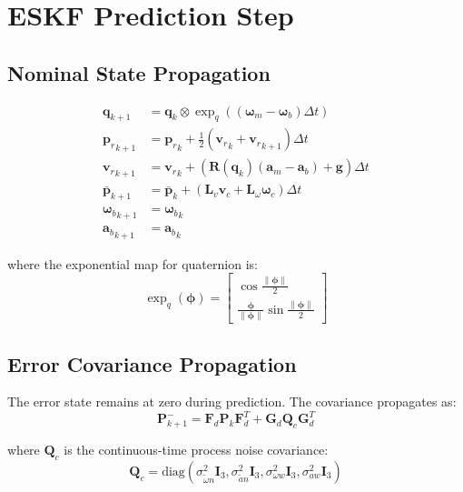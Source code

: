 \documentclass[11pt,a4paper]{article}
\newcommand{\quat}{\mathbf{q}}
\newcommand{\pr}{\mathbf{p}_r}
\newcommand{\vr}{\mathbf{v}_r}
\newcommand{\pbar}{\bar{\mathbf{p}}}
\newcommand{\bgyr}{\bm{\omega}_b}
\newcommand{\bacc}{\mathbf{a}_b}
\newcommand{\R}{\mathbf{R}}
\newcommand{\I}{\mathbf{I}}
\begin{document}
\section{ESKF Prediction Step}

\subsection{Nominal State Propagation}
\begin{align}
    \quat_{k+1} &= \quat_k \otimes \exp_q\left((\bm{\omega}_m - \bgyr) \Delta t\right) \\
    {\pr}_{k+1} &= {\pr}_k + \frac{1}{2}({\vr}_k + {\vr}_{k+1}) \Delta t \\
    {\vr}_{k+1} &= {\vr}_k + \left(\R(\quat_k)(\mathbf{a}_m - \bacc) + \mathbf{g}\right) \Delta t \\
    {\pbar}_{k+1} &= {\pbar}_k + \left(\mathbf{L}_v \mathbf{v}_c + \mathbf{L}_\omega \bm{\omega}_c\right) \Delta t \\
    {\bgyr}_{k+1} &= {\bgyr}_k \\
    {\bacc}_{k+1} &= {\bacc}_k
\end{align}

where the exponential map for quaternion is:
\begin{equation}
    \exp_q(\bm{\phi}) = \begin{bmatrix} \cos\frac{\|\bm{\phi}\|}{2} \\ \frac{\bm{\phi}}{\|\bm{\phi}\|} \sin\frac{\|\bm{\phi}\|}{2} \end{bmatrix}
\end{equation}

\subsection{Error Covariance Propagation}
The error state remains at zero during prediction. The covariance propagates as:
\begin{equation}
    \mathbf{P}_{k+1}^- = \mathbf{F}_d \mathbf{P}_k \mathbf{F}_d^T + \mathbf{G}_d \mathbf{Q}_c \mathbf{G}_d^T
\end{equation}

where $\mathbf{Q}_c$ is the continuous-time process noise covariance:
\begin{equation}
    \mathbf{Q}_c = \text{diag}\left(\sigma_{\tilde{\omega}n}^2 \I_3, \sigma_{\tilde{a}n}^2 \I_3, \sigma_{\omega w}^2 \I_3, \sigma_{aw}^2 \I_3\right)
\end{equation}
\end{document}
